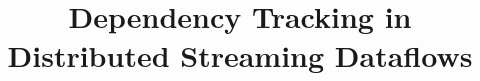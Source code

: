 \documentclass[sigconf]{acmart}
\theoremstyle{remark}
\begin{document}

\title {Dependency Tracking in Distributed Streaming Dataflows}





\end{document}
